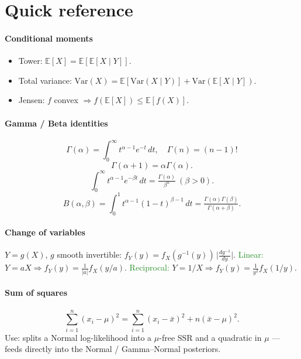 
\section{Quick reference}

\paragraph{Conditional moments}
\begin{itemize}
  \item \textcolor{Bittersweet}{Tower}: $\mathbb{E}[X]=\mathbb{E}[\mathbb{E}[X\mid Y]]$.
  \item \textcolor{Bittersweet}{Total variance}: $\mathrm{Var}(X)=\mathbb{E}[\mathrm{Var}(X\mid Y)]+\mathrm{Var}(\mathbb{E}[X\mid Y])$.
  \item \textcolor{Bittersweet}{Jensen}: $f$ convex $\Rightarrow f(\mathbb{E}[X])\le \mathbb{E}[f(X)]$.
\end{itemize}

\paragraph{Gamma / Beta identities}
\[\Gamma(\alpha)=\int_0^\infty t^{\alpha-1}e^{-t}\,dt,\quad \Gamma(n)=(n-1)!\]
\[\Gamma(\alpha+1)=\alpha\Gamma(\alpha).\]
\[\int_0^\infty t^{\alpha-1}e^{-\beta t}\,dt=\tfrac{\Gamma(\alpha)}{\beta^{\alpha}}\ (\beta>0).\]
\[B(\alpha,\beta)=\int_0^1 t^{\alpha-1}(1-t)^{\beta-1}\,dt=\tfrac{\Gamma(\alpha)\Gamma(\beta)}{\Gamma(\alpha+\beta)}.\]

\paragraph{Change of variables}
$Y=g(X)$, $g$ smooth invertible: $f_Y(y)=f_X(g^{-1}(y))\,\bigl|\tfrac{dg^{-1}}{dy}\bigr|$.
\textcolor{ForestGreen}{Linear:} $Y=aX\Rightarrow f_Y(y)=\tfrac{1}{|a|}f_X(y/a)$.
\textcolor{ForestGreen}{Reciprocal:} $Y=1/X\Rightarrow f_Y(y)=\tfrac{1}{y^{2}}f_X(1/y)$.

\paragraph{Sum of squares}
\[\sum_{i=1}^{n}(x_i-\mu)^{2}=\sum_{i=1}^{n}(x_i-\bar{x})^{2}+n(\bar{x}-\mu)^{2}.\]
\textcolor{Bittersweet}{Use:} splits a Normal log-likelihood into a $\mu$-free SSR and a quadratic in $\mu$ — feeds directly into the Normal / Gamma–Normal posteriors.

